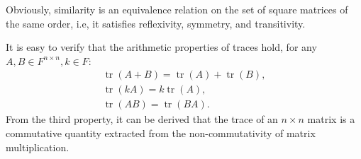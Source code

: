 \documentclass[11pt]{../../TexTemplate/elegantbook} %
\begin{document}
Obviously, similarity is an equivalence relation on the set of square matrices of the same order,
i.e, it satisfies reflexivity, symmetry, and transitivity.

It is easy to verify that the arithmetic properties of traces hold, for any \( A, B \in F^{n \times n}, k \in F \):
\begin{gather*}
    \operatorname{tr}(A + B) = \operatorname{tr}(A) + \operatorname{tr}(B), \\
    \operatorname{tr}(kA) = k \operatorname{tr}(A), \\
    \operatorname{tr}(AB) = \operatorname{tr}(BA).
\end{gather*}
From the third property, it can be derived that the trace of an \(n\times n\) matrix is a commutative quantity 
extracted from the non-commutativity of matrix multiplication.
\end{document}
